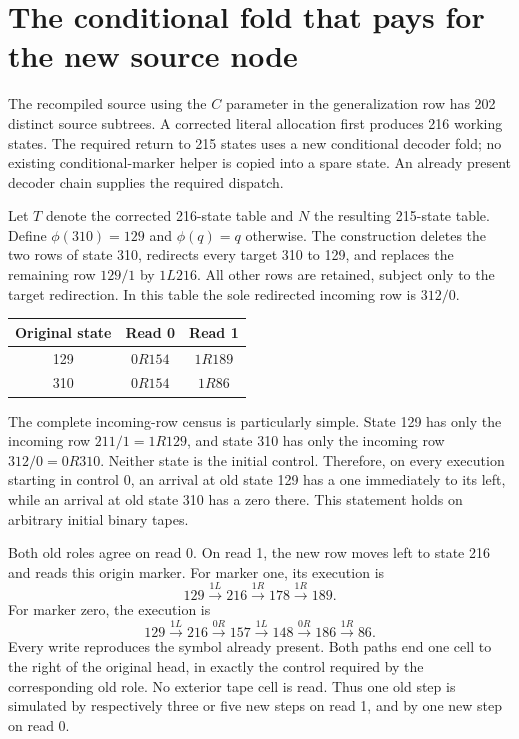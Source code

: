 \section{The conditional fold that pays for the new source node}

The recompiled source using the $C$ parameter in the generalization row has
202 distinct source subtrees. A corrected literal allocation first produces
216 working states. The required return to 215 states uses a new conditional
decoder fold; no existing conditional-marker helper is copied into a spare
state. An already present decoder chain supplies the required dispatch.

Let $T$ denote the corrected 216-state table and $N$ the resulting 215-state
table. Define $\phi(310)=129$ and $\phi(q)=q$ otherwise. The construction deletes
the two rows of state 310, redirects every target 310 to 129, and replaces
the remaining row $129/1$ by $1L216$. All other rows are retained, subject
only to the target redirection. In this table the sole redirected incoming
row is $312/0$.

\begin{center}
\begin{tabular}{c|cc}
Original state & Read 0 & Read 1\\\hline
129 & $0R154$ & $1R189$\\
310 & $0R154$ & $1R86$
\end{tabular}
\end{center}

The complete incoming-row census is particularly simple. State 129 has only
the incoming row $211/1=1R129$, and state 310 has only the incoming row
$312/0=0R310$. Neither state is the initial control. Therefore, on every
execution starting in control 0, an arrival at old state 129 has a one
immediately to its left, while an arrival at old state 310 has a zero there.
This statement holds on arbitrary initial binary tapes.

Both old roles agree on read 0. On read 1, the new row moves left to state
216 and reads this origin marker. For marker one, its execution is
\[
 129 \xrightarrow{1L}216\xrightarrow{1R}178\xrightarrow{1R}189.
\]
For marker zero, the execution is
\[
 129\xrightarrow{1L}216\xrightarrow{0R}157
     \xrightarrow{1L}148\xrightarrow{0R}186\xrightarrow{1R}86.
\]
Every write reproduces the symbol already present. Both paths end one cell
to the right of the original head, in exactly the control required by the
corresponding old role. No exterior tape cell is read. Thus one old step
is simulated by respectively three or five new steps on read 1, and by one
new step on read 0.

